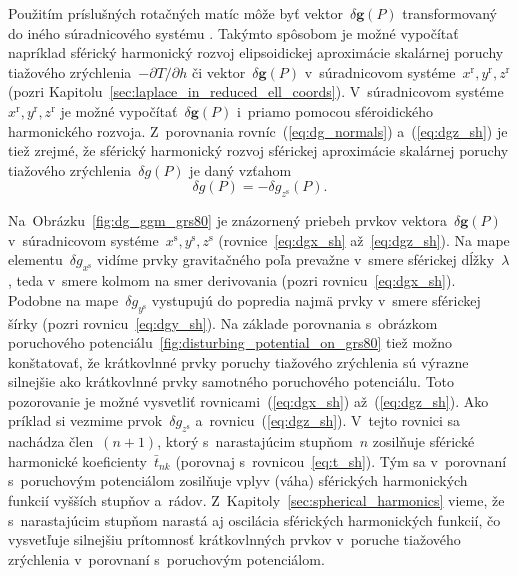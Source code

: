 \documentclass[a4paper, 12pt]{book}
\let\vec\mathbf
\begin{document}
Použitím príslušných rotačných matíc môže byť vektor~$\delta \vec g(P)$ 
transformovaný do iného súradnicového systému \parencite[pozri 
napríklad][]{WGS84}.  Takýmto spôsobom je možné vypočítať napríklad sférický 
harmonický rozvoj elipsoidickej aproximácie skalárnej poruchy tiažového 
zrýchlenia~$-\partial T \slash \partial h$ či vektor~$\delta \vec g(P)$ 
v~súradnicovom systéme~$x^\mathrm{r}, y^\mathrm{r}, z^\mathrm{r}$ (pozri 
Kapitolu~\ref{sec:laplace_in_reduced_ell_coords}).  V~súradnicovom 
systéme~$x^\mathrm{r}, y^\mathrm{r}, z^\mathrm{r}$ je možné vypočítať~$\delta 
\vec g(P)$ i~priamo pomocou sféroidického harmonického rozvoja.  Z~porovnania 
rovníc~(\ref{eq:dg_normals}) a~(\ref{eq:dgz_sh}) je tiež zrejmé, že sférický 
harmonický rozvoj sférickej aproximácie skalárnej poruchy tiažového 
zrýchlenia~$\delta g(P)$ je daný vzťahom
%
\begin{equation}
\label{eq:dg_sh_sa}
\delta g(P) = -\delta g_{z^\mathrm{s}}(P){.}
\end{equation}

Na~Obrázku~\ref{fig:dg_ggm_grs80} je znázornený priebeh prvkov vektora~$\delta 
\vec g(P)$ v~súradnicovom systéme~$x^\mathrm{s}, y^\mathrm{s}, z^\mathrm{s}$ 
(rovnice~\ref{eq:dgx_sh} až~\ref{eq:dgz_sh}).  Na mape elementu~$\delta 
g_{x^\mathrm{s}}$ vidíme prvky gravitačného poľa prevažne v~smere sférickej 
dĺžky~$\lambda$, teda v~smere kolmom na smer derivovania (pozri 
rovnicu~\ref{eq:dgx_sh}).  Podobne na mape~$\delta g_{y^\mathrm{s}}$ vystupujú 
do popredia najmä prvky v~smere sférickej šírky (pozri 
rovnicu~\ref{eq:dgy_sh}).  Na základe porovnania s~obrázkom poruchového 
potenciálu~\ref{fig:disturbing_potential_on_grs80} tiež možno konštatovať, že 
krátkovlnné prvky poruchy tiažového zrýchlenia sú výrazne silnejšie ako 
krátkovlnné prvky samotného poruchového potenciálu.  Toto pozorovanie je možné 
vysvetliť rovnicami~(\ref{eq:dgx_sh}) až~(\ref{eq:dgz_sh}).  Ako príklad si 
vezmime prvok~$\delta g_{z^\mathrm{s}}$ a~rovnicu~(\ref{eq:dgz_sh}).  V~tejto 
rovnici sa nachádza člen~$(n + 1)$, ktorý s~narastajúcim stupňom~$n$ zosilňuje 
sférické harmonické koeficienty~$\bar{t}_{nk}$ (porovnaj 
s~rovnicou~\ref{eq:t_sh}).  Tým sa v~porovnaní s~poruchovým potenciálom 
zosilňuje vplyv (váha) sférických harmonických funkcií vyšších stupňov a~rádov.  
Z~Kapitoly~\ref{sec:spherical_harmonics} vieme, že s~narastajúcim stupňom 
narastá aj oscilácia sférických harmonických funkcií, čo vysvetľuje silnejšiu 
prítomnosť krátkovlnných prvkov v~poruche tiažového zrýchlenia v~porovnaní 
s~poruchovým potenciálom.
\end{document}
